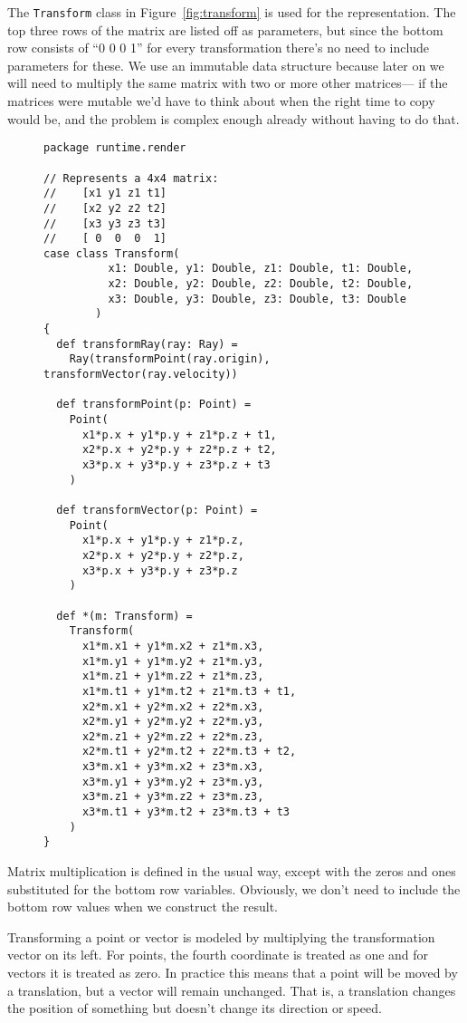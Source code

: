 The \verb!Transform! class in Figure~\ref{fig:transform}
is used for the representation.
The top three rows of the matrix are listed off as parameters,
but since the bottom row consists of ``0 0 0 1'' for every transformation
there's no need to include parameters for these.
We use an immutable data structure because
later on we will need to multiply the same matrix
with two or more other matrices---%
if the matrices were mutable we'd have to think about
when the right time to copy would be,
and the problem is complex enough already without having to do that.

\begin{figure}
\begin{verbatim}
package runtime.render

// Represents a 4x4 matrix:
//    [x1 y1 z1 t1]
//    [x2 y2 z2 t2]
//    [x3 y3 z3 t3]
//    [ 0  0  0  1]
case class Transform(
          x1: Double, y1: Double, z1: Double, t1: Double,
          x2: Double, y2: Double, z2: Double, t2: Double,
          x3: Double, y3: Double, z3: Double, t3: Double
        )
{
  def transformRay(ray: Ray) =
    Ray(transformPoint(ray.origin), transformVector(ray.velocity))

  def transformPoint(p: Point) =
    Point(
      x1*p.x + y1*p.y + z1*p.z + t1,
      x2*p.x + y2*p.y + z2*p.z + t2,
      x3*p.x + y3*p.y + z3*p.z + t3
    )

  def transformVector(p: Point) =
    Point(
      x1*p.x + y1*p.y + z1*p.z,
      x2*p.x + y2*p.y + z2*p.z,
      x3*p.x + y3*p.y + z3*p.z
    )

  def *(m: Transform) =
    Transform(
      x1*m.x1 + y1*m.x2 + z1*m.x3,
      x1*m.y1 + y1*m.y2 + z1*m.y3,
      x1*m.z1 + y1*m.z2 + z1*m.z3,
      x1*m.t1 + y1*m.t2 + z1*m.t3 + t1,
      x2*m.x1 + y2*m.x2 + z2*m.x3,
      x2*m.y1 + y2*m.y2 + z2*m.y3,
      x2*m.z1 + y2*m.z2 + z2*m.z3,
      x2*m.t1 + y2*m.t2 + z2*m.t3 + t2,
      x3*m.x1 + y3*m.x2 + z3*m.x3,
      x3*m.y1 + y3*m.y2 + z3*m.y3,
      x3*m.z1 + y3*m.z2 + z3*m.z3,
      x3*m.t1 + y3*m.t2 + z3*m.t3 + t3
    )
}
\end{verbatim}
\getcaption
\end{figure}

Matrix multiplication is defined in the usual way,
except with the zeros and ones substituted for the bottom row variables.
Obviously, we don't need to include the bottom row values
when we construct the result.

Transforming a point or vector is modeled by
multiplying the transformation vector on its left.
For points, the fourth coordinate is treated as one
and for vectors it is treated as zero.
In practice this means that a point will be moved by a translation,
but a vector will remain unchanged.
That is, a translation changes the position of something
but doesn't change its direction or speed.

